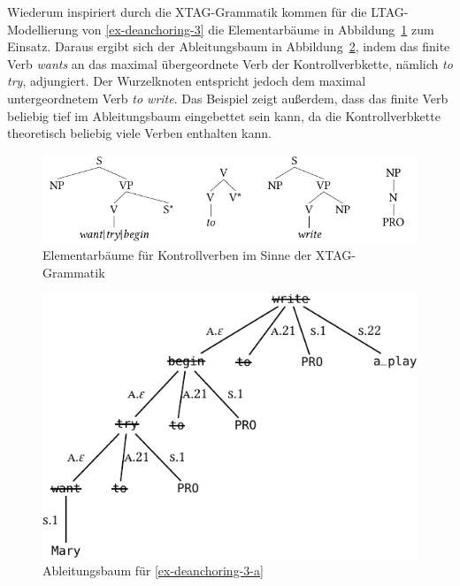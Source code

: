 Wiederum inspiriert durch die XTAG-Grammatik kommen für die LTAG-Model\-lie\-rung von \ref{ex-deanchoring-3} die Elementarbäume in Abbildung~\ref{fig-deanchoring-4} zum Einsatz. Daraus ergibt sich der Ableitungsbaum in Abbildung~\ref{fig-deanchoring-5}, indem das finite Verb {\it wants} an das maximal übergeordnete Verb der Kontrollverbkette, nämlich {\it to try}, adjungiert. Der Wurzelknoten entspricht jedoch dem maximal untergeordnetem Verb {\it to write}. Das Beispiel zeigt au\ss erdem, dass das finite Verb beliebig tief im Ableitungsbaum eingebettet sein kann, da die Kontrollverbkette theoretisch beliebig viele Verben enthalten kann.

\begin{figure}[t]
\centering
\includegraphics{graphics/abb817.pdf}
\caption{\label{fig-deanchoring-4}Elementarbäume für Kontrollverben im Sinne der XTAG-Grammatik \citep[Figure~5]{Lichte:Kallmeyer:10}}
\end{figure}

\begin{figure}[t]
\centering
\includegraphics{graphics/abb818.pdf}
\caption{\label{fig-deanchoring-5}Ableitungsbaum für \ref{ex-deanchoring-3-a} \citep[Figure~6]{Lichte:Kallmeyer:10}}
\end{figure}

